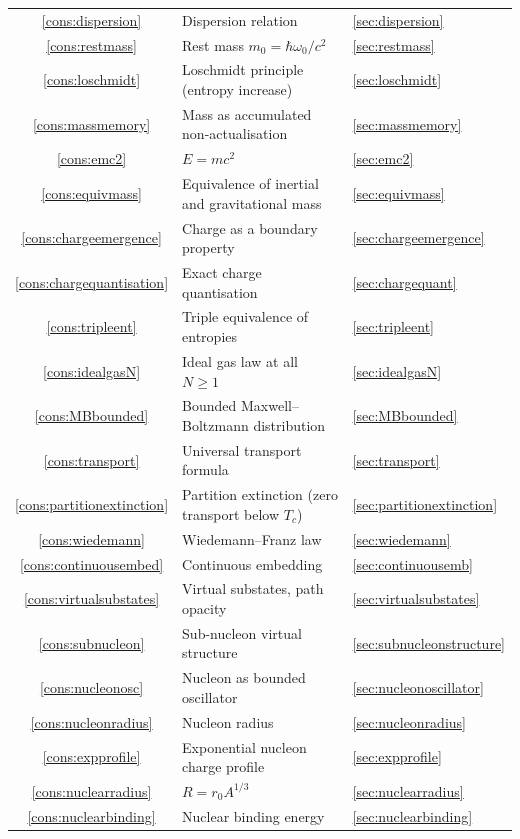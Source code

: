 \documentclass[11pt,twocolumn,a4paper]{article}
\theoremstyle{axiomstyle}
\theoremstyle{conseqstyle}
\theoremstyle{definition}
\theoremstyle{remark}
\begin{document}
\begin{center}
\begin{tabular}{c|l|l}
\ref{cons:dispersion} & Dispersion relation & \ref{sec:dispersion}\\
\ref{cons:restmass} & Rest mass $m_{0}=\hbar\omega_{0}/c^{2}$ & \ref{sec:restmass}\\
\ref{cons:loschmidt} & Loschmidt principle (entropy increase) & \ref{sec:loschmidt}\\
\ref{cons:massmemory} & Mass as accumulated non-actualisation & \ref{sec:massmemory}\\
\ref{cons:emc2} & $E=mc^{2}$ & \ref{sec:emc2}\\
\ref{cons:equivmass} & Equivalence of inertial and gravitational mass & \ref{sec:equivmass}\\
\ref{cons:chargeemergence} & Charge as a boundary property & \ref{sec:chargeemergence}\\
\ref{cons:chargequantisation} & Exact charge quantisation & \ref{sec:chargequant}\\
\ref{cons:tripleent} & Triple equivalence of entropies & \ref{sec:tripleent}\\
\ref{cons:idealgasN} & Ideal gas law at all $N\ge 1$ & \ref{sec:idealgasN}\\
\ref{cons:MBbounded} & Bounded Maxwell--Boltzmann distribution & \ref{sec:MBbounded}\\
\ref{cons:transport} & Universal transport formula & \ref{sec:transport}\\
\ref{cons:partitionextinction} & Partition extinction (zero transport below $T_{c}$) & \ref{sec:partitionextinction}\\
\ref{cons:wiedemann} & Wiedemann--Franz law & \ref{sec:wiedemann}\\
\ref{cons:continuousembed} & Continuous embedding & \ref{sec:continuousemb}\\
\ref{cons:virtualsubstates} & Virtual substates, path opacity & \ref{sec:virtualsubstates}\\
\ref{cons:subnucleon} & Sub-nucleon virtual structure & \ref{sec:subnucleonstructure}\\
\ref{cons:nucleonosc} & Nucleon as bounded oscillator & \ref{sec:nucleonoscillator}\\
\ref{cons:nucleonradius} & Nucleon radius & \ref{sec:nucleonradius}\\
\ref{cons:expprofile} & Exponential nucleon charge profile & \ref{sec:expprofile}\\
\ref{cons:nuclearradius} & $R=r_{0}A^{1/3}$ & \ref{sec:nuclearradius}\\
\ref{cons:nuclearbinding} & Nuclear binding energy & \ref{sec:nuclearbinding}\\

\end{tabular}
\end{center}
\end{document}

